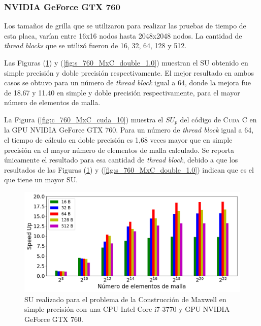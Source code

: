 

\subsubsection{NVIDIA GeForce GTX 760}

Los tamaños de grilla que se utilizaron para realizar las pruebas de tiempo de esta placa, varían entre 16x16 nodos hasta 2048x2048 nodos. La cantidad de \textit{thread blocks} que se utilizó fueron de 16, 32, 64, 128 y 512.

Las Figuras (\ref{fig:s_760_MxC_simple_1.0}) y (\ref{fig:s_760_MxC_double_1.0}) muestran el SU obtenido en simple precisión y doble precisión respectivamente. El mejor resultado en ambos casos se obtuvo para un número de \textit{thread block} igual a 64, donde la mejora fue de 18.67 y 11.40 en simple y doble precisión respectivamente, para el mayor número de elementos de malla.

La Figura (\ref{fig:c_760_MxC_cuda_10}) muestra el ${SU}_p$ del código de \textsc{Cuda C} en la GPU NVIDIA GeForce GTX 760. Para un número de \textit{thread block} igual a 64, el tiempo de cálculo en doble precisión es 1,68 veces mayor que en simple precisión en el mayor número de elementos de malla calculado. Se reporta únicamente el resultado para esa cantidad de \textit{thread block}, debido a que los resultados de las Figuras (\ref{fig:s_760_MxC_simple_1.0}) y (\ref{fig:s_760_MxC_double_1.0}) indican que es el que tiene un mayor SU.

\begin{figure}[htbp]
	\centering
	\includegraphics[width=\textwidth]{figs_2/cap4/s_760_MxC_simple_10}
	\caption{SU realizado para el problema de la Construcción de Maxwell en simple precisión con una CPU Intel Core i7-3770 y GPU NVIDIA GeForce GTX 760.} 
	\label{fig:s_760_MxC_simple_1.0}	
\end{figure}

